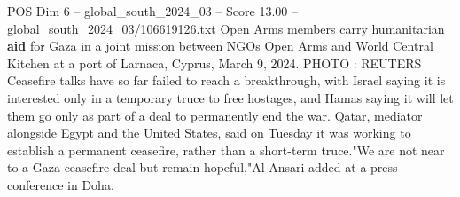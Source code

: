 \begin{textsample}{POS Dim 6 – global\_south\_2024\_03 – Score 13.00 – global\_south\_2024\_03/106619126.txt}
Open Arms members carry humanitarian \textbf{aid} for Gaza in a joint mission between NGOs Open Arms and World Central Kitchen at a port of Larnaca, Cyprus, March 9, 2024.
PHOTO : REUTERS Ceasefire talks have so far failed to reach a breakthrough, with Israel saying it is interested only in a temporary truce to free hostages, and Hamas saying it will let them go only as part of a deal to permanently end the war.
Qatar, mediator alongside Egypt and the United States, said on Tuesday it was working to establish a permanent ceasefire, rather than a short-term truce."We are not near to a Gaza ceasefire deal but remain hopeful,"Al-Ansari added at a press conference in Doha.

\end{textsample}
